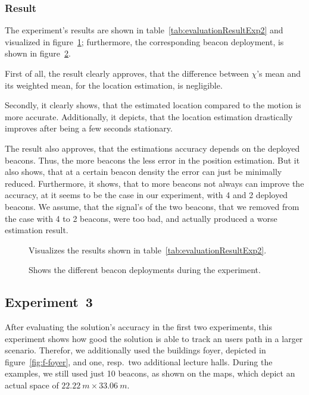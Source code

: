 \subsubsection*{Result}
The experiment's results are shown in table~\ref{tab:evaluationResultExp2} and visualized in figure~\ref{fig:exp2_visualization}; furthermore, the corresponding beacon deployment, is shown in figure~\ref{fig:exp2_imgs}.

First of all, the result clearly approves, that the difference between $\chi$'s mean and its weighted mean, for the location estimation, is negligible.

Secondly, it clearly shows, that the estimated location compared to the motion is more accurate. Additionally, it depicts, that the location estimation drastically improves after being a few seconds stationary.

The result also approves, that the estimations accuracy depends on the deployed beacons. Thus, the more beacons the less error in the position estimation. But it also shows, that at a certain beacon density the error can just be minimally reduced. Furthermore, it shows, that to more beacons not always can improve the accuracy, at it seems to be the case in our experiment, with 4 and 2 deployed beacons. We assume, that the signal's of the two beacons, that we removed from the case with 4 to 2 beacons, were too bad, and actually produced a worse estimation result.

\begin{table}
	
	\caption{Depicts the results of experiment~2.}
	\label{tab:evaluationResultExp2}
\end{table}

\begin{figure}
	
	\caption{Visualizes the results shown in table~\ref{tab:evaluationResultExp2}.}
	\label{fig:exp2_visualization}
\end{figure}


\begin{figure}
	
	\caption{Shows the different beacon deployments during the experiment.}
	\label{fig:exp2_imgs}
\end{figure}


\subsection*{Experiment~3}
After evaluating the solution's accuracy in the first two experiments, this experiment shows how good the solution is able to track an users path in a larger scenario. Therefor, we additionally used the buildings foyer, depicted in figure~\ref{fig:f-foyer}, and one, resp.\ two additional lecture halls. During the examples, we still used just 10 beacons, as shown on the maps, which depict an actual space of $22.22~m \times 33.06~m$.

